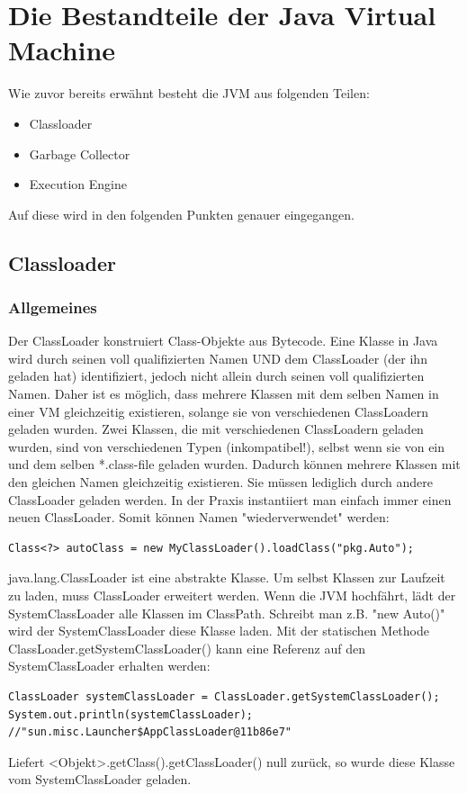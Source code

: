 \documentclass[a4paper,14pt]{scrreprt}
\begin{document}
\chapter{Die Bestandteile der Java Virtual Machine}
Wie zuvor bereits erwähnt besteht die JVM aus folgenden Teilen:
\begin{itemize}
\item Classloader
\item Garbage Collector
\item Execution Engine
\end{itemize}
Auf diese wird in den folgenden Punkten genauer eingegangen.
\section{Classloader}
\subsection{Allgemeines}
Der ClassLoader konstruiert Class-Objekte aus Bytecode. Eine Klasse in Java wird durch seinen voll qualifizierten Namen UND dem ClassLoader (der ihn geladen hat) identifiziert, jedoch nicht allein durch seinen voll qualifizierten Namen. Daher ist es möglich, dass mehrere Klassen mit dem selben Namen in einer VM gleichzeitig existieren, solange sie von verschiedenen ClassLoadern geladen wurden. Zwei Klassen, die mit verschiedenen ClassLoadern geladen wurden, sind von verschiedenen Typen (inkompatibel!), selbst wenn sie von ein und dem selben *.class-file geladen wurden. Dadurch können mehrere Klassen mit den gleichen Namen gleichzeitig existieren. Sie müssen lediglich durch andere ClassLoader geladen werden. In der Praxis instantiiert man einfach immer einen neuen ClassLoader. Somit können Namen "wiederverwendet" werden:
\begin{lstlisting}
Class<?> autoClass = new MyClassLoader().loadClass("pkg.Auto");
\end{lstlisting}
java.lang.ClassLoader ist eine abstrakte Klasse. Um selbst Klassen zur Laufzeit zu laden, muss ClassLoader erweitert werden. Wenn die JVM hochfährt, lädt der SystemClassLoader alle Klassen im ClassPath. Schreibt man z.B. "new Auto()" wird der SystemClassLoader diese Klasse laden. Mit der statischen Methode ClassLoader.getSystemClassLoader() kann eine Referenz auf den SystemClassLoader erhalten werden:
\begin{lstlisting}
ClassLoader systemClassLoader = ClassLoader.getSystemClassLoader();
System.out.println(systemClassLoader); //"sun.misc.Launcher$AppClassLoader@11b86e7"
\end{lstlisting}
Liefert <Objekt>.getClass().getClassLoader() null zurück, so wurde diese Klasse vom SystemClassLoader geladen.
\end{document}
